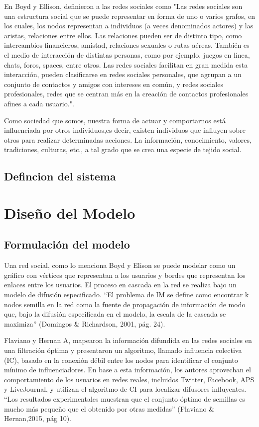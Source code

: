 \documentclass{article}
\begin{document}
 En Boyd y Ellison, definieron a las redes sociales como "Las redes sociales son una estructura social que se puede representar en forma de uno o varios grafos, en los cuales, los nodos representan a individuos (a veces denominados actores) y las aristas, relaciones entre ellos. Las relaciones pueden ser de distinto tipo, como intercambios financieros, amistad, relaciones sexuales o rutas aéreas. También es el medio de interacción de distintas personas, como por ejemplo, juegos en línea, chats, foros, spaces, entre otros. Las redes sociales facilitan en gran medida esta interacción, pueden clasificarse en redes sociales personales, que agrupan a un conjunto de contactos y amigos con intereses en común, y redes sociales profesionales, redes que se centran más en la creación de contactos profesionales afines a cada usuario."\cite{definition:redsocial}. 
 
 Como sociedad que somos, nuestra forma de actuar y comportarnos está influenciada por otros individuos,es decir, existen individuos que influyen sobre otros para realizar determinadas acciones. La información, conocimiento, valores, tradiciones, culturas, etc., a tal grado que se crea una especie de tejido social.
   
 \subsection{Defincion del sistema}

 
\section{Diseño del Modelo}
 
 \subsection{Formulación del modelo}
  Una red social, como lo menciona Boyd y Elison se puede modelar como un gráfico con vértices que representan a los usuarios y bordes que representan los enlaces entre los usuarios. El proceso en cascada en la red se realiza bajo un modelo de difusión especificado.
 “El problema de IM se define como encontrar k nodos semilla en la red como la fuente de  propagación de información de modo que, bajo la difusión especificada en el modelo, la escala  de la cascada se maximiza” (Domingos \& Richardson, 2001, pág. 24).
 
 Flaviano y Hernan A, mapearon la información difundida en las redes sociales en una  filtración óptima y presentaron un algoritmo, llamado influencia colectiva (IC), basado en la  conexión débil entre los nodos para identificar el conjunto mínimo de influenciadores. En base a  esta información, los autores aprovechan el comportamiento de los usuarios en redes reales,  incluidos Twitter, Facebook, APS y LiveJournal, y utilizan el algoritmo de CI para localizar  difusores influyentes. “Los resultados experimentales muestran que el conjunto óptimo de semillas es mucho más pequeño que el obtenido por otras medidas” (Flaviano \& Hernan,2015, pág 10).
 
\end{document}
